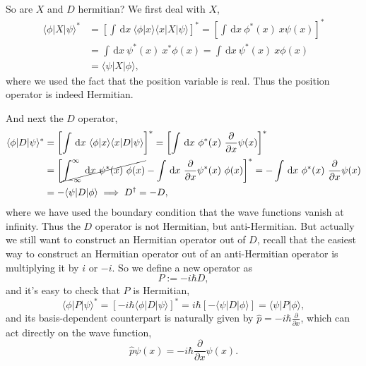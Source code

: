 \documentclass{article}
\newcommand{\be}{\begin{equation}}
\newcommand{\ee}{\end{equation}}
\newcommand{\dif}{\,\mathrm{d}}
\newcommand{\p}{\partial}
\renewcommand{\1}{\left}
\renewcommand{\2}{\right}
\newcommand{\la}{\langle}
\newcommand{\ra}{\rangle}
\begin{document}
So are $X$ and $D$ hermitian? We first deal with $X$,
\be\begin{split}
\la\phi|X|\psi\ra^*&=\1[\int\dif x\ \la\phi|x\ra\la x|X|\psi\ra\2]^*=\1[\int\dif x\ \phi^*(x)\ x \psi(x)\2]^*\\
&=\int\dif x\ \psi^*(x)\ x^* \phi(x)=\int\dif x\ \psi^*(x)\ x \phi(x)\\
&=\la\psi|X|\phi\ra,
\end{split}\ee
where we used the fact that the position variable is real. Thus the position operator is indeed Hermitian.

And next the $D$ operator,
\be\begin{split}
\la\phi|D|\psi\ra^*&=\1[\int\dif x\ \la\phi|x\ra\la x|D|\psi\ra\2]^*=\1[\int\dif x\ \phi^*(x)\  \frac\p{\p x}\psi(x)\2]^*\\
&=\1[\cancel{\int_{-\infty}^{\infty} \dif x\ \psi^*(x)\ \phi(x)}-\int\dif x\ \frac\p{\p x}\psi^*(x)\ \phi(x)\2]^*=-\int\dif x\ \phi^*(x)\  \frac\p{\p x}\psi(x)\\
&=-\la\psi|D|\phi\ra \implies D^\dagger=-D,
\end{split}\ee
where we have used the boundary condition that the wave functions vanish at infinity. Thus the $D$ operator is not Hermitian, but anti-Hermitian. But actually we still want to construct an Hermitian operator out of $D$, recall that the easiest way to construct an Hermitian operator out of an anti-Hermitian operator is multiplying it by $i$ or $-i$. So we define a new operator as
\be
P:=-i\hbar D,
\ee
and it's easy to check that $P$ is Hermitian,
\be
\la\phi|P|\psi\ra^*=[-i\hbar\la\phi|D|\psi\ra]^*=i\hbar[-\la\psi|D|\phi\ra]=\la\psi|P|\phi\ra,
\ee
and its basis-dependent counterpart is naturally given by $\hat p=-i\hbar\frac\p{\p x}$, which can act directly on the wave function,
\be
\hat p\psi(x)=-i\hbar\frac\p{\p x}\psi(x).
\ee\\
\end{document}
